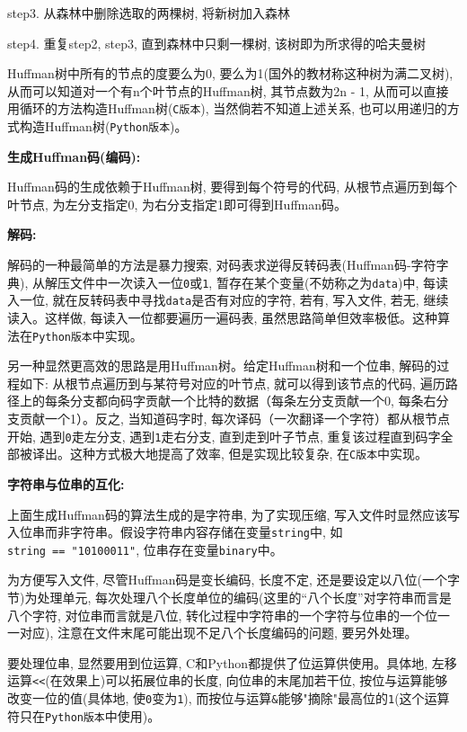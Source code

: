 \documentclass[a4paper]{ctexart}
\begin{document}
step3. 从森林中删除选取的两棵树, 将新树加入森林

step4. 重复step2, step3, 直到森林中只剩一棵树, 该树即为所求得的哈夫曼树

Huffman树中所有的节点的度要么为0, 要么为1(国外的教材称这种树为满二叉树), 从而可以知道对一个有n个叶节点的Huffman树, 其节点数为2n - 1, 从而可以直接用循环的方法构造Huffman树(\texttt{C版本}),
当然倘若不知道上述关系, 也可以用递归的方式构造Huffman树(\texttt{Python版本})。

\textbf{生成Huffman码(编码):}

Huffman码的生成依赖于Huffman树, 要得到每个符号的代码, 从根节点遍历到每个叶节点, 为左分支指定0,
为右分支指定1即可得到Huffman码。

\textbf{解码:}

解码的一种最简单的方法是暴力搜索, 对码表求逆得反转码表(Huffman码-字符字典), 从解压文件中一次读入一位\texttt{0}或\texttt{1}, 暂存在某个变量(不妨称之为\texttt{data})中, 每读入一位, 就在反转码表中寻找\texttt{data}是否有对应的字符, 若有, 写入文件, 若无, 继续读入。这样做, 每读入一位都要遍历一遍码表, 虽然思路简单但效率极低。这种算法在\texttt{Python版本}中实现。

另一种显然更高效的思路是用Huffman树。给定Huffman树和一个位串, 解码的过程如下: 从根节点遍历到与某符号对应的叶节点, 就可以得到该节点的代码, 遍历路径上的每条分支都向码字贡献一个比特的数据（每条左分支贡献一个0, 每条右分支贡献一个1）。反之, 当知道码字时, 每次译码（一次翻译一个字符）都从根节点开始, 遇到\texttt{0}走左分支, 遇到\texttt{1}走右分支, 直到走到叶子节点, 重复该过程直到码字全部被译出。这种方式极大地提高了效率, 但是实现比较复杂, 在\texttt{C版本}中实现。

\textbf{字符串与位串的互化:}

上面生成Huffman码的算法生成的是字符串, 为了实现压缩, 写入文件时显然应该写入位串而非字符串。假设字符串内容存储在变量\texttt{string}中, 如\texttt{string\ ==\ "10100011"}, 位串存在变量\texttt{binary}中。

为方便写入文件, 尽管Huffman码是变长编码, 长度不定, 还是要设定以八位(一个字节)为处理单元, 每次处理八个长度单位的编码(这里的“八个长度”对字符串而言是八个字符, 对位串而言就是八位, 转化过程中字符串的一个字符与位串的一个位一一对应), 注意在文件末尾可能出现不足八个长度编码的问题, 要另外处理。

要处理位串, 显然要用到位运算, C和Python都提供了位运算供使用。具体地, 左移运算\texttt{\textless{}\textless{}}(在效果上)可以拓展位串的长度, 向位串的末尾加若干位, 按位与运算\texttt{\textbar{}}能够改变一位的值(具体地, 使\texttt{0}变为\texttt{1}), 而按位与运算\texttt{\&}能够"摘除"最高位的\texttt{1}(这个运算符只在\texttt{Python版本}中使用)。
\end{document}
